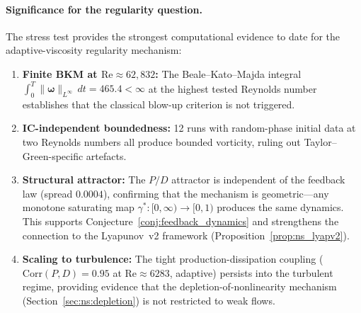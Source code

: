 \paragraph{Significance for the regularity question.}
The stress test provides the strongest computational evidence
to date for the adaptive-viscosity regularity mechanism:
\begin{enumerate}
\item \textbf{Finite BKM at $\mathrm{Re}\approx 62{,}832$:}
  The Beale--Kato--Majda integral $\int_0^T
  \|\bm{\omega}\|_{L^\infty}\,dt = 465.4 < \infty$
  at the highest tested Reynolds number establishes that
  the classical blow-up criterion is not triggered.

\item \textbf{IC-independent boundedness:}  12 runs with
  random-phase initial data at two Reynolds numbers
  all produce bounded vorticity, ruling out
  Taylor--Green-specific artefacts.

\item \textbf{Structural attractor:}  The $P/D$ attractor
  is independent of the feedback law (spread $0.0004$),
  confirming that the mechanism is geometric---any
  monotone saturating map $\gamma^* \colon [0,\infty) \to
  [0,1)$ produces the same dynamics.  This supports
  Conjecture~\ref{conj:feedback_dynamics} and strengthens
  the connection to the Lyapunov~v2 framework
  (Proposition~\ref{prop:ns_lyapv2}).

\item \textbf{Scaling to turbulence:}  The tight
  production-dissipation coupling
  ($\mathrm{Corr}(P,D) = 0.95$ at
  $\mathrm{Re}\approx 6283$, adaptive) persists into
  the turbulent regime, providing evidence that the
  depletion-of-nonlinearity mechanism
  (Section~\ref{sec:ns:depletion}) is not restricted
  to weak flows.
\end{enumerate}